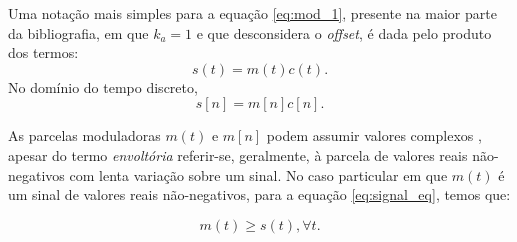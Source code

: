 
Uma notação mais simples para a equação \eqref{eq:mod_1}, presente na maior
parte da bibliografia, em que $k_a = 1$ e que desconsidera o \textit{offset}, é
dada pelo produto dos termos:
\begin{equation}
    s(t) = m(t)c(t). \label{eq:signal_eq}
\end{equation}
No domínio do tempo discreto,
\begin{equation}
    s[n] = m[n]c[n]. 
\end{equation}

As parcelas moduladoras $m(t)$ e $m[n]$ podem assumir valores complexos
 \cite{schimmel2007}, apesar do termo \textit{envoltória} referir-se,
 geralmente, à parcela de valores reais não-negativos \cite{haykin2008} com
 lenta variação sobre um sinal. No caso particular em que $m(t)$ é um sinal de
 valores reais não-negativos, para a equação \eqref{eq:signal_eq}, temos que:

\begin{equation}
    m(t) \geq s(t), \forall t.
\end{equation}

